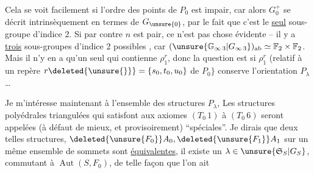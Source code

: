 
Cela se voit facilement si l'ordre des points de $P_0$ est impair, car alors $G_0^+$ se décrit intrinsèquement  en termes de $G_{\unsure{0}}$, par le fait que c'est le \uline{seul} sous-groupe d'indice 2. Si par contre $n$ est pair, ce n'est pas chose évidente -- il y a \uline{trois} sous-groupes d'indice 2 possibles , car $(\unsure{\mathbb G_{\infty\,3}|G_{\infty\,3}})_{\mathrm{ab}}\simeq\mathbb F_2\times\mathbb F_2$. Mais il n'y en a qu'un seul qui contienne $\rho_1^r$, donc la question est si $\rho_1^r$ (relatif à un repère $r\deleted{\unsure{\}}}=\{s_0,t_0,u_0\}$ de $P_0\}$ conserve l'orientation  $P_\lambda$\ldots


Je m'intéresse maintenant à l'ensemble des structures $P_\lambda$,   Les structures polyédrales triangulées qui satisfont aux axiomes $(T_0\,1)$ à $(T_0\,6)$ seront appelées (à défaut de mieux, et provisoirement) ``spéciales''. Je dirais que deux telles structures,  $\deleted{\unsure{F_0}}A_0,\deleted{\unsure{F_1}}A_1$ sur un même ensemble de sommets  sont \uline{équivalentes}, il existe un $\lambda\in\unsure{\mathfrak S_S|G_S}$, commutant à $\operatorname{Aut}(S,F_0)$, de telle façon que l'on ait
